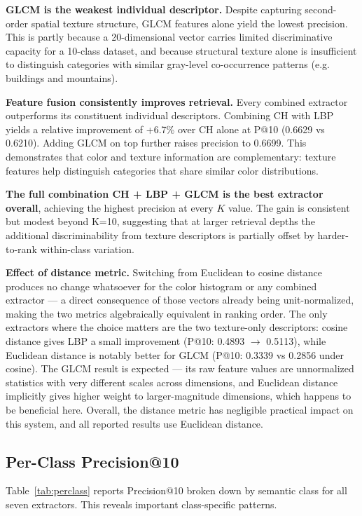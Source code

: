 \documentclass[12pt, a4paper]{article}
\begin{document}
\textbf{GLCM is the weakest individual descriptor.} Despite capturing second-order spatial
texture structure, GLCM features alone yield the lowest precision. This is partly because a
20-dimensional vector carries limited discriminative capacity for a 10-class dataset, and
because structural texture alone is insufficient to distinguish categories with similar gray-level
co-occurrence patterns (e.g. buildings and mountains).

\textbf{Feature fusion consistently improves retrieval.} Every combined extractor outperforms
its constituent individual descriptors. Combining CH with LBP yields a relative improvement of
+6.7\% over CH alone at P@10 (0.6629 vs 0.6210). Adding GLCM on top further raises
precision to 0.6699. This demonstrates that color and texture information are complementary:
texture features help distinguish categories that share similar color distributions.

\textbf{The full combination CH + LBP + GLCM is the best extractor overall}, achieving the
highest precision at every $K$ value. The gain is consistent but modest beyond K=10,
suggesting that at larger retrieval depths the additional discriminability from texture
descriptors is partially offset by harder-to-rank within-class variation.

\textbf{Effect of distance metric.} Switching from Euclidean to cosine distance produces
no change whatsoever for the color histogram or any combined extractor — a direct
consequence of those vectors already being unit-normalized, making the two metrics
algebraically equivalent in ranking order. The only extractors where the choice matters are
the two texture-only descriptors: cosine distance gives LBP a small improvement
(P@10: 0.4893 $\to$ 0.5113), while Euclidean distance is notably better for GLCM
(P@10: 0.3339 vs 0.2856 under cosine). The GLCM result is expected — its raw feature
values are unnormalized statistics with very different scales across dimensions, and
Euclidean distance implicitly gives higher weight to larger-magnitude dimensions, which
happens to be beneficial here. Overall, the distance metric has negligible practical impact
on this system, and all reported results use Euclidean distance.

\subsection{Per-Class Precision@10}

Table~\ref{tab:perclass} reports Precision@10 broken down by semantic class for all seven
extractors. This reveals important class-specific patterns.
\end{document}
